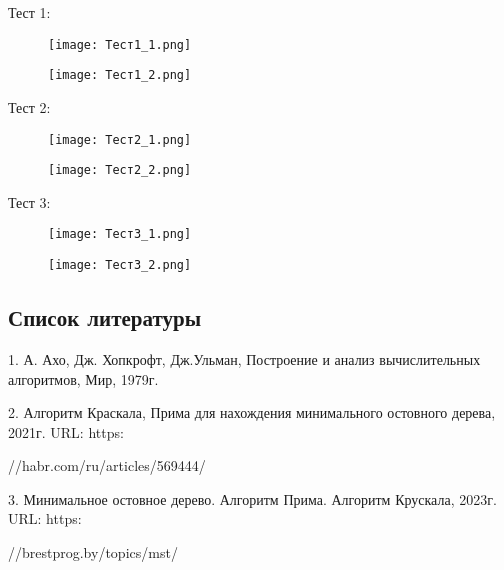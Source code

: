 \documentclass[a4paper,16pt]{article}
\begin{document}
Тест 1:
\begin{figure}[h]
    \centering
    \texttt{[image: Тест1\_1.png]}
\end{figure}
\hypertarget{1}{}

\begin{figure}[h]
    \centering
    \texttt{[image: Тест1\_2.png]}
\end{figure}
\hypertarget{1}{}
\newpage 
Тест 2:

\begin{figure}[h]
    \centering
    \texttt{[image: Тест2\_1.png]}
\end{figure}
\hypertarget{1}{}

\begin{figure}[h]
    \centering
    \texttt{[image: Тест2\_2.png]}
\end{figure}
\hypertarget{1}{}
\newpage 

Тест 3:

\begin{figure}[h]
    \centering
    \texttt{[image: Тест3\_1.png]}
\end{figure}
\hypertarget{1}{}

\begin{figure}[h]
    \centering
    \texttt{[image: Тест3\_2.png]}
\end{figure}
\hypertarget{1}{}

\newpage

\begin{center}
   \section{Список литературы} 
\end{center}

\vspace{1cm}

1. А. Ахо, Дж. Хопкрофт, Дж.Ульман, Построение и анализ вычислительных алгоритмов, Мир, 1979г.

2. Алгоритм Краскала, Прима для нахождения минимального остовного дерева, 2021г. URL: https:

//habr.com/ru/articles/569444/

3. Минимальное остовное дерево. Алгоритм Прима. Алгоритм Крускала, 2023г. URL: https:

//brestprog.by/topics/mst/
\end{document}
